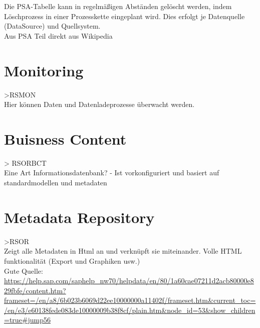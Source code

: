 Die PSA-Tabelle kann in regelmäßigen Abständen gelöscht werden, indem Löschprozess in einer Prozesskette eingeplant wird. Dies erfolgt je Datenquelle (DataSource) und Quellsystem. \\ 
Aus PSA Teil direkt aus Wikipedia

\chapter{Monitoring}
>RSMON\\
Hier können Daten und Datenladeprozesse überwacht werden.

\chapter{Buisness Content}
> RSORBCT\\
Eine Art Informationsdatenbank?
- Ist vorkonfiguriert und basiert auf standardmodellen und metadaten

\chapter{Metadata Repository}
>RSOR\\
Zeigt alle Metadaten in Html an und verknüpft sie miteinander. Volle HTML funktionalität (Export und Graphiken usw.)\\

Gute Quelle:
\url{https://help.sap.com/saphelp_nw70/helpdata/en/80/1a60cae07211d2acb80000e829fbfe/content.htm?frameset=/en/a8/6b023b6069d22ee10000000a11402f/frameset.htm&current_toc=/en/e3/e60138fede083de10000009b38f8cf/plain.htm&node_id=53&show_children=true#jump56}